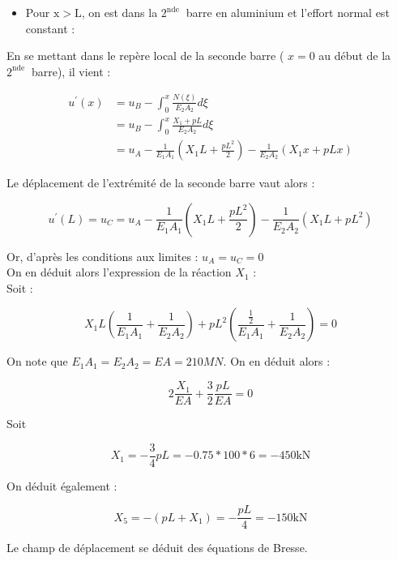 \documentclass[11pt,a4paper]{report}
\begin{document}
\begin{enumerate}
{\begin{mdframed}
      \begin{itemize}
        \item Pour $\mathrm{x}>\mathrm{L}$, on est dans la $2^{\text {nde }}$ barre en aluminium et l'effort normal est constant :
      \end{itemize}

      En se mettant dans le repère local de la seconde barre ( $x=0$ au début de la $2^{\text {nde }}$ barre), il vient :

      \begin{align*}
      u^{\prime}(x)& =u_{B}-\int_{0}^{x} \frac{N(\xi)}{E_{2} A_{2}} d \xi\\
       & =u_{B}-\int_{0}^{x} \frac{X_{1}+p L}{E_{2} A_{2}} d \xi\\
       & =u_{A}-\frac{1}{E_{1} A_{1}}\left(X_{1} L+\frac{p L^{2}}{2}\right)-\frac{1}{E_{2} A_{2}}\left(X_{1} x+p L x\right)
      \end{align*}

      Le déplacement de l'extrémité de la seconde barre vaut alors :

      $$
      u^{\prime}(L)=u_{C}=u_{A}-\frac{1}{E_{1} A_{1}}\left(X_{1} L+\frac{p L^{2}}{2}\right)-\frac{1}{E_{2} A_{2}}\left(X_{1} L+p L^{2}\right)
      $$

      Or, d'après les conditions aux limites : $u_{A}=u_{C}=0$\\
      On en déduit alors l'expression de la réaction $X_{1}$ :\\
      Soit :

      $$
      X_{1} L\left(\frac{1}{E_{1} A_{1}}+\frac{1}{E_{2} A_{2}}\right)+p L^{2}\left(\frac{\frac{1}{2}}{E_{1} A_{1}}+\frac{1}{E_{2} A_{2}}\right)=0
      $$

      On note que $E_{1} A_{1}=E_{2} A_{2}=E A=210 M N$. On en déduit alors :

      $$
      2 \frac{X_{1}}{E A}+\frac{3}{2}\frac{p L}{E A}=0
      $$

      Soit

      $$
      X_{1}=-\frac{3}{4} p L=- 0.75 * 100 * 6=-450 \mathrm{kN}
      $$

      On déduit également :

      $$
      X_{5}=-(p L+X_{1})=-\frac{p L}{4}=-150 \mathrm{kN}
      $$
    \end{mdframed}
  }{
  }
  \vspace{1em}

      Le champ de déplacement se déduit des équations de Bresse.\newline 


\end{enumerate}
\end{document}
